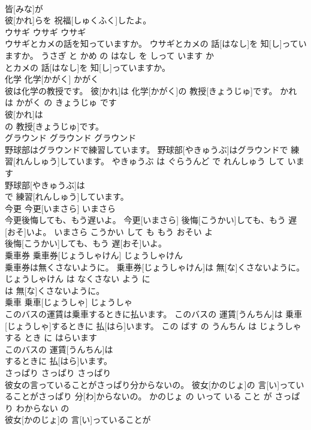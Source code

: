 \documentclass[8pt]{extreport}
\begin{document}
\begin{CJK}{UTF8}{min}
\\	皆[みな]が
\\	彼[かれ]らを 祝福[しゅくふく]したよ。			
\\	ウサギ	ウサギ	ウサギ	
\\	ウサギとカメの話を知っていますか。	ウサギとカメの 話[はなし]を 知[し]っていますか。	うさぎ と かめ の はなし を しって います か	
\\	とカメの 話[はなし]を 知[し]っていますか。			
\\	化学	化学[かがく]	かがく	
\\	彼は化学の教授です。	彼[かれ]は 化学[かがく]の 教授[きょうじゅ]です。	かれ は かがく の きょうじゅ です	
\\	彼[かれ]は
\\	の 教授[きょうじゅ]です。			
\\	グラウンド	グラウンド	グラウンド	
\\	野球部はグラウンドで練習しています。	野球部[やきゅうぶ]はグラウンドで 練習[れんしゅう]しています。	やきゅうぶ は ぐらうんど で れんしゅう して います	
\\	野球部[やきゅうぶ]は
\\	で 練習[れんしゅう]しています。			
\\	今更	今更[いまさら]	いまさら	
\\	今更後悔しても、もう遅いよ。	今更[いまさら] 後悔[こうかい]しても、もう 遅[おそ]いよ。	いまさら こうかい して も もう おそい よ	
\\	後悔[こうかい]しても、もう 遅[おそ]いよ。			
\\	乗車券	乗車券[じょうしゃけん]	じょうしゃけん	
\\	乗車券は無くさないように。	乗車券[じょうしゃけん]は 無[な]くさないように。	じょうしゃけん は なくさない よう に	
\\	は 無[な]くさないように。			
\\	乗車	乗車[じょうしゃ]	じょうしゃ	
\\	このバスの運賃は乗車するときに払います。	このバスの 運賃[うんちん]は 乗車[じょうしゃ]するときに 払[はら]います。	この ばす の うんちん は じょうしゃ する とき に はらいます	
\\	このバスの 運賃[うんちん]は
\\	するときに 払[はら]います。			
\\	さっぱり	さっぱり	さっぱり	
\\	彼女の言っていることがさっぱり分からないの。	彼女[かのじょ]の 言[い]っていることがさっぱり 分[わ]からないの。	かのじょ の いって いる こと が さっぱり わからない の	
\\	彼女[かのじょ]の 言[い]っていることが

\end{CJK}
\end{document}

